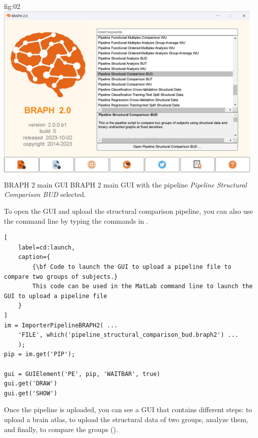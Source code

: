 \documentclass[justified]{tufte-handout}
\begin{document}
	{fig:02}
	{\includegraphics{fig02.jpg}}
	{BRAPH 2 main GUI}
	{
	BRAPH 2 main GUI with the pipeline \emph{Pipeline Structural Comparison BUD} selected.
	}


\begin{tcolorbox}[
	title=Pipeline launch from command line
	]
	To open the GUI and upload the structural comparison pipeline, you can also use the command line by typing the commands in .

\begin{lstlisting}[
	label=cd:launch,
	caption={
		{\bf Code to launch the GUI to upload a pipeline file to compare two groups of subjects.}
		This code can be used in the MatLab command line to launch the GUI to upload a pipeline file
	}
]
im = ImporterPipelineBRAPH2( ...
	'FILE', which('pipeline_structural_comparison_bud.braph2') ...
	);
pip = im.get('PIP');
	
gui = GUIElement('PE', pip, 'WAITBAR', true)
gui.get('DRAW')
gui.get('SHOW')
\end{lstlisting}
\end{tcolorbox}


Once the pipeline is uploaded, you can see a GUI that contains different steps: to upload a brain atlas, to upload the structural data of two groups, analyze them, and finally, to compare the groups (). 
\end{document}
